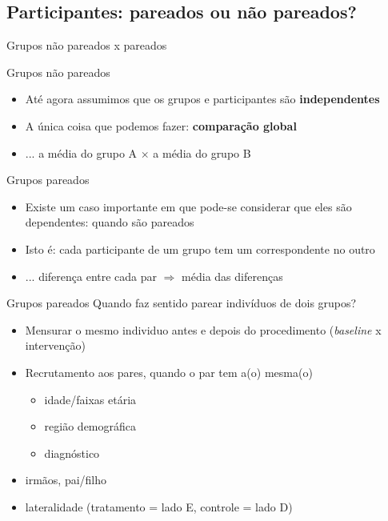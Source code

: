 \documentclass{beamer}
\begin{document}
\subsection{Participantes: pareados ou não pareados?}

\begin{frame}{Grupos não pareados x pareados}
  \begin{block}{Grupos não pareados}
    \begin{itemize}
    \item Até agora assumimos que os grupos e participantes são {\bf independentes}
    \item A única coisa que podemos fazer: {\bf comparação global}
    \item ... a média do grupo A $\times$ a média do grupo B
    \end{itemize}
  \end{block}
  \begin{block}{Grupos pareados}
    \begin{itemize}
    \item Existe um caso importante em que pode-se considerar que eles são dependentes: quando são pareados
    \item Isto é: cada participante de um grupo tem um correspondente no outro
    \item ... diferença entre cada par $\Rightarrow$ média das diferenças
    \end{itemize}
  \end{block}
\end{frame}

\begin{frame}{Grupos pareados}
Quando faz sentido parear indivíduos de dois grupos?
  \begin{itemize}
  \item Mensurar o \alert{mesmo} individuo antes e depois do procedimento ({\em baseline} x intervenção)
  \item Recrutamento aos pares, quando o par tem a(o) mesma(o)
    \begin{itemize}
    \item idade/faixas etária
    \item região demográfica
    \item diagnóstico
    \end{itemize}
  \item irmãos, pai/filho
  \item lateralidade (tratamento = lado E, controle = lado D)
  \end{itemize}
\end{frame}
\end{document}
